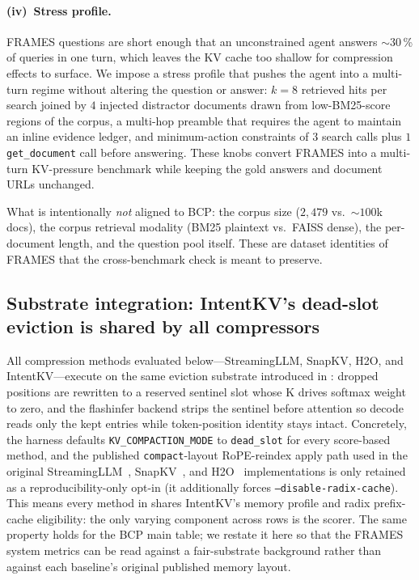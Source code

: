 \documentclass[11pt]{article}
\newcommand{\method}{IntentKV\xspace}
\begin{document}
\paragraph{(iv)~Stress profile.}
FRAMES questions are short enough that an unconstrained agent
answers $\sim$$30$\,\% of queries in one turn, which leaves the KV
cache too shallow for compression effects to surface. We impose a
stress profile that pushes the agent into a multi-turn regime
without altering the question or answer: $k\!=\!8$ retrieved hits
per search joined by $4$ injected distractor documents drawn from
low-BM25-score regions of the corpus, a multi-hop preamble that
requires the agent to maintain an inline evidence ledger, and
minimum-action constraints of $3$ search calls plus $1$
\texttt{get\_document} call before answering. These knobs convert
FRAMES into a multi-turn KV-pressure benchmark while keeping the
gold answers and document URLs unchanged.

What is intentionally \emph{not} aligned to BCP: the corpus size
($2{,}479$ vs.\ $\sim$$100$k docs), the corpus retrieval modality
(BM25 plaintext vs.\ FAISS dense), the per-document length, and the
question pool itself. These are dataset identities of FRAMES that
the cross-benchmark check is meant to preserve.

\subsection{Substrate integration: \method's dead-slot eviction is shared by all compressors}
\label{appendix:frames-substrate}

All compression methods evaluated below---StreamingLLM, SnapKV, H2O,
and \method---execute on the same eviction substrate introduced in
: dropped positions are rewritten to a
reserved sentinel slot whose K drives softmax weight to zero, and
the flashinfer backend strips the sentinel before attention so
decode reads only the kept entries while token-position identity
stays intact. Concretely, the harness defaults
\texttt{KV\_COMPACTION\_MODE} to \texttt{dead\_slot} for every
score-based method, and the published \texttt{compact}-layout
RoPE-reindex apply path used in the original
StreamingLLM~\citep{xiao2024efficient},
SnapKV~\citep{li2024snapkv}, and H2O~\citep{zhang2023h2o}
implementations is only retained as a reproducibility-only opt-in
(it additionally forces \texttt{--disable-radix-cache}). This means
every method in  shares \method's memory
profile and radix prefix-cache eligibility: the only varying
component across rows is the scorer. The same property holds for
the BCP main table; we restate it here so that the FRAMES system
metrics can be read against a fair-substrate background rather than
against each baseline's original published memory layout.
\end{document}
